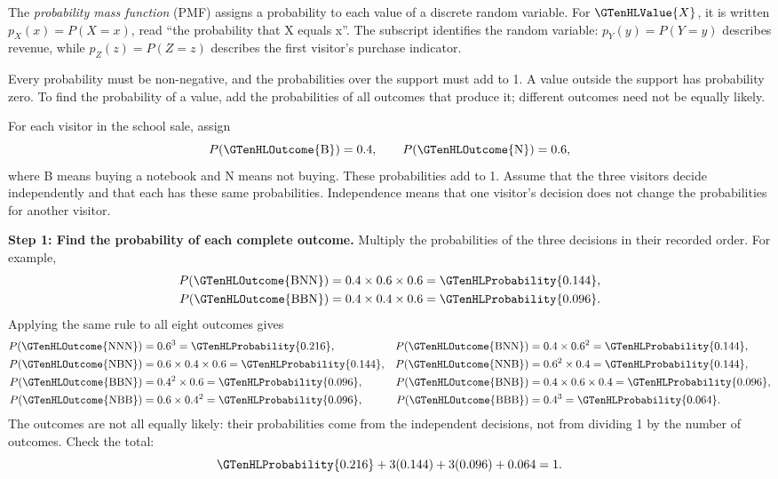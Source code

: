 The \emph{probability mass function} (PMF) assigns a probability to each value of a discrete random variable. For $\GTenHLValue{X}$, it is written $p_X(x)=P(X=x)$, read ``the probability that X equals x''. The subscript identifies the random variable: $p_Y(y)=P(Y=y)$ describes revenue, while $p_Z(z)=P(Z=z)$ describes the first visitor's purchase indicator.

Every probability must be non-negative, and the probabilities over the support must add to 1. A value outside the support has probability zero. To find the probability of a value, add the probabilities of all outcomes that produce it; different outcomes need not be equally likely.

For each visitor in the school sale, assign
\[
P(\GTenHLOutcome{\mathrm{B}})=0.4,\qquad P(\GTenHLOutcome{\mathrm{N}})=0.6,
\]
where B means buying a notebook and N means not buying. These probabilities add to 1. Assume that the three visitors decide independently and that each has these same probabilities. Independence means that one visitor's decision does not change the probabilities for another visitor.

\textbf{Step 1: Find the probability of each complete outcome.} Multiply the probabilities of the three decisions in their recorded order. For example,
\[
\begin{aligned}
P(\GTenHLOutcome{\mathrm{BNN}})&=0.4\times0.6\times0.6=\GTenHLProbability{0.144},\\
P(\GTenHLOutcome{\mathrm{BBN}})&=0.4\times0.4\times0.6=\GTenHLProbability{0.096}.
\end{aligned}
\]
Applying the same rule to all eight outcomes gives
\[
\begin{aligned}
	P(\GTenHLOutcome{\mathrm{NNN}})&=0.6^3=\GTenHLProbability{0.216}, & P(\GTenHLOutcome{\mathrm{BNN}})&=0.4\times0.6^2=\GTenHLProbability{0.144},\\
	P(\GTenHLOutcome{\mathrm{NBN}})&=0.6\times0.4\times0.6=\GTenHLProbability{0.144}, & P(\GTenHLOutcome{\mathrm{NNB}})&=0.6^2\times0.4=\GTenHLProbability{0.144},\\
	P(\GTenHLOutcome{\mathrm{BBN}})&=0.4^2\times0.6=\GTenHLProbability{0.096}, & P(\GTenHLOutcome{\mathrm{BNB}})&=0.4\times0.6\times0.4=\GTenHLProbability{0.096},\\
	P(\GTenHLOutcome{\mathrm{NBB}})&=0.6\times0.4^2=\GTenHLProbability{0.096}, & P(\GTenHLOutcome{\mathrm{BBB}})&=0.4^3=\GTenHLProbability{0.064}.
\end{aligned}
\]
The outcomes are not all equally likely: their probabilities come from the independent decisions, not from dividing 1 by the number of outcomes. Check the total:
\[
\GTenHLProbability{0.216}+3(0.144)+3(0.096)+0.064=1.
\]

